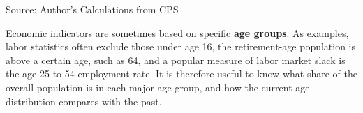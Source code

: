 \documentclass{report}
\makeatletter
\newcommand{\tbllink}[1]{\href{https://raw.githubusercontent.com/bdecon/US-chartbook/master/chartbook/data/#1}{\faTable}}
\newcommand*\short[1]{\expandafter\@gobbletwo\number\numexpr#1\relax}
\newcommand{\absnode}[3]{\node[below right, align=left] at (axis cs: #1,#2) {#3};}
\newcommand{\shdateaxisticks}{
		date coordinates in=x, axis line style={draw=none},
		xmax={2023-10-01},
		max space between ticks=40,	    
		xtick={{1990-01-01}, {1995-01-01}, {2000-01-01}, 
			{2005-01-01}, {2010-01-01}, {2015-01-01}, {2020-01-01}},
		minor xtick={},
		enlarge y limits={0.06}, enlarge x limits={0.01},
		}
\newcommand{\bbar}[2]{extra #1 ticks = {{#2}}, extra #1 tick labels = ,
		extra #1 tick style = {grid=major, grid style={thick, black!25}},}
\newcommand{\stdline}[4]{\addplot[very thick, no markers, color=#1] 
		table [x=#2, y=#3, col sep=comma] {#4};	}
\newcommand{\rbars}{
		\fill[color=black!10] (axis cs:{1990-07-01},\pgfkeysvalueof{/pgfplots/ymin}) rectangle 
			(axis cs:{1991-03-01}, \pgfkeysvalueof{/pgfplots/ymax});
		\fill[color=black!10] (axis cs:{2007-12-01},\pgfkeysvalueof{/pgfplots/ymin}) rectangle 
			(axis cs:{2009-07-01}, \pgfkeysvalueof{/pgfplots/ymax});
		\fill[color=black!10] (axis cs:{2001-03-01},\pgfkeysvalueof{/pgfplots/ymin}) rectangle 
			(axis cs:{2001-11-01}, \pgfkeysvalueof{/pgfplots/ymax});
		\fill[color=black!10] (axis cs:{2020-02-01},\pgfkeysvalueof{/pgfplots/ymin}) rectangle 
			(axis cs:{2020-05-01}, \pgfkeysvalueof{/pgfplots/ymax});}
\makeatother
\begin{document}
{\begin{minipage}{0.76\textwidth}
\begin{minipage}{0.53\textwidth}
\hspace{2mm} 

\footnotesize{Source: Author's Calculations from CPS} \hfill \tbllink{median_age.csv}
\end{minipage}
\vspace{3mm}

\small Economic indicators are sometimes based on specific \textbf{age groups}. As examples, labor statistics often exclude those under age 16, the retirement-age population is above a certain age, such as 64, and a popular measure of labor market slack is the age 25 to 54 employment rate. It is therefore useful to know what share of the overall population is in each major age group, and how the current age distribution compares with the past. 
\end{minipage}
\vspace{0.5mm}

}
\end{document}
